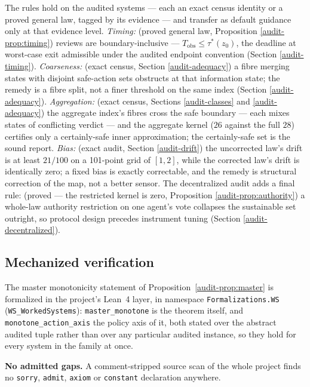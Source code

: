 \documentclass[10pt,twocolumn]{article}
\theoremstyle{plain}
\theoremstyle{definition}
\theoremstyle{remark}
\begin{document}
The rules hold on the audited systems --- each an exact census identity or a proved general law, tagged by its evidence --- and transfer as default guidance only at that evidence level. \emph{Timing:} (proved general law, Proposition \ref{audit-prop:timing}) reviews are boundary-inclusive ---
\(T_{\mathrm{obs}} \le \tau^{*}(z_0)\), the deadline at worst-case exit admissible under the audited endpoint convention (Section \ref{audit-timing}). \emph{Coarseness:} (exact census, Section \ref{audit-adequacy}) a fibre
merging states with disjoint safe-action sets obstructs at that
information state; the remedy is a fibre split, not a finer threshold
on the same index (Section \ref{audit-adequacy}). \emph{Aggregation:} (exact census, Sections \ref{audit-classes} and \ref{audit-adequacy}) the aggregate index's fibres cross the safe boundary --- each mixes states of conflicting verdict --- and the aggregate kernel (\(26\) against the full \(28\)) certifies only a certainly-safe inner approximation; the certainly-safe set is the sound report.
\emph{Bias:} (exact audit, Section \ref{audit-drift}) the uncorrected law's drift is at least \(21/100\) on a
101-point grid of \([1,2]\), while the corrected law's drift is
identically zero; a fixed bias is exactly correctable, and the remedy is
structural correction of the map, not a better sensor. The decentralized audit adds a final rule: (proved --- the restricted kernel is zero, Proposition \ref{audit-prop:authority}) a whole-law authority restriction on one agent's vote collapses the sustainable set outright, so protocol
design precedes instrument tuning (Section \ref{audit-decentralized}).

\subsection{Mechanized verification}
\label{audit-mech}

The master monotonicity statement of Proposition~\ref{audit-prop:master} is formalized in the
project's Lean~4 layer, in namespace \texttt{Formalizations.WS}
(\texttt{WS\_WorkedSystems}): \texttt{master\_monotone} is the theorem itself, and
\texttt{monotone\_action\_axis} the policy axis of it, both stated over the abstract audited
tuple rather than over any particular audited instance, so they hold for every system in the
family at once.

\noindent\textbf{No admitted gaps.} A comment-stripped source scan of the whole project finds
no \texttt{sorry}, \texttt{admit}, \texttt{axiom} or \texttt{constant} declaration anywhere.
\end{document}

